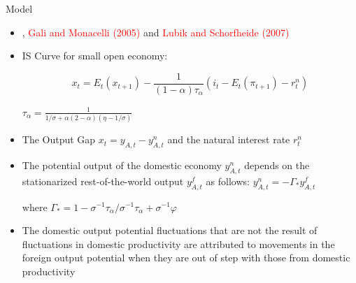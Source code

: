 \documentclass[9pt]{beamer}
\begin{document}
\begin{frame}{Model}
\begin{itemize}

\item \textcolor{red}{\citet{Grossman:2019}}, \textcolor{red}{Gali and Monacelli (2005)} and \textcolor{red}{Lubik and Schorfheide (2007)}

\item IS Curve for small open economy:

\begin{equation*}
    x_t = E_t(x_{t+1}) - \frac{1}{(1-\alpha)\tau_{\alpha}}\left(i_t - E_t(\pi_{t+1}) - r_t^{n} \right)
\end{equation*}

$\tau_{\alpha} = \frac{1}{1/\sigma + \alpha(2 - \alpha)(\eta - 1/\sigma)}$

\item The Output Gap $x_t = y_{A,t} - y_{A,t}^{n}$ and the natural interest rate $r_t^{n}$

\item The potential output of the domestic economy $y_{A,t}^{n}$ depends on the stationarized rest-of-the-world output  $y_{A,t}^{f}$ as follows: $y_{A,t}^{n} = - \Gamma_{*}y_{A,t}^{f} $

where $\Gamma_{*}=1-\sigma^{-1} \tau_{\alpha} / \sigma^{-1} \tau_{\alpha}+\sigma^{-1} \varphi$

\item The domestic output potential fluctuations that are not the result of fluctuations in domestic productivity are attributed to movements in the foreign output potential when they are out of step with those
from domestic productivity


\end{itemize}
\end{frame}
\end{document}

